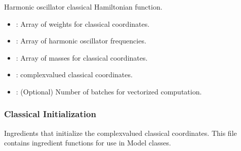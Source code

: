 \documentclass[letterpaper,10pt,english]{sphinxmanual}
\begin{document}
\begin{fulllineitems}
\label{\detokenize{software_reference/ingredients/ingredients:qc_lab.ingredients.harmonic_oscillator_h_c}}
\pysigstartsignatures
\pysiglinewithargsret
{}
{\sphinxparamcomma {}\sphinxparamcomma {}\sphinxparamcomma {}}
{}
\pysigstopsignatures
\sphinxAtStartPar
Harmonic oscillator classical Hamiltonian function.
\begin{description}
\begin{itemize}
\item {} 
\sphinxAtStartPar
{}: Array of weights for classical coordinates.

\item {} 
\sphinxAtStartPar
{}: Array of harmonic oscillator frequencies.

\item {} 
\sphinxAtStartPar
{}: Array of masses for classical coordinates.

\end{itemize}

\begin{itemize}
\item {} 
\sphinxAtStartPar
{}: complex\sphinxhyphen{}valued classical coordinates.

\item {} 
\sphinxAtStartPar
{}: (Optional) Number of batches for vectorized computation.

\end{itemize}

\end{description}

\end{fulllineitems}



\subsubsection{Classical Initialization}
\label{\detokenize{software_reference/ingredients/ingredients:classical-initialization}}
\sphinxAtStartPar
Ingredients that initialize the complex\sphinxhyphen{}valued classical coordinates.
\label{\detokenize{software_reference/ingredients/ingredients:module-2}}
\sphinxAtStartPar
This file contains ingredient functions for use in Model classes.
\end{document}
